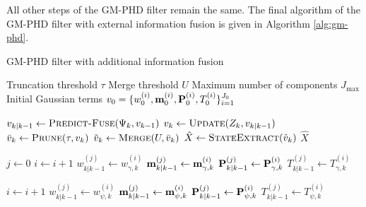 All other steps of the GM-PHD filter remain the same. The final algorithm of the GM-PHD filter with external information fusion is given in Algorithm \ref{alg:gm-phd}.

\begin{algorithm}
\caption{GM-PHD filter with additional information fusion}\label{alg:gm-phd}
\begin{algorithmic}[1]
    \Require Truncation threshold $\tau$
    \Require Merge threshold $U$
    \Require Maximum number of components $J_\mathrm{max}$
    \Require Initial Gaussian terms $v_0 = \{ w_{0}^{(i)}, \vecat{m}{0}^{(i)}, \vecat{P}{0}^{(i)}, T_0^{(i)}\}_{i=1}^{J_0}$

    \item[]
    \label{alg:gm-phd:step}
        \State $v_{k|k-1} \gets \Call{Predict-Fuse}{\Psi_k, v_{k-1}}$
        \State $v_{k} \gets \Call{Update}{Z_k, v_{k|k-1}}$ 
        \State $\bar{v}_k \gets \Call{Prune}{\tau, v_{k}}$ 
        \State $\tilde{v}_k \gets \Call{Merge}{U, \bar{v}_k}$ 
        \State $\hat{X} \gets \Call{StateExtract}{\tilde{v}_k}$ 
        \State \Return $\hat{X}$
    \EndProcedure
    
    \item[]
    \label{alg:gm-phd:predict-fuse}
        \State $j \gets 0$
         
            \State $i \gets i + 1$
            \State $w_{k|k-1}^{(j)} \gets w_{\gamma, k}^{(i)}$
            \State $\vecat{m}{k|k-1}^{(j)} \gets \vecat{m}{\gamma, k}^{(i)}$
            \State $\vecat{P}{k|k-1}^{(j)} \gets \vecat{P}{\gamma, k}^{(i)}$
            \State $T_{k|k-1}^{(j)} \gets T_{\gamma, k}^{(i)}$
        \EndFor

         
            \State $i \gets i + 1$
            \State $w_{k|k-1}^{(j)} \gets w_{\psi, k}^{(i)}$
            \State $\vecat{m}{k|k-1}^{(j)} \gets \vecat{m}{\psi, k}^{(i)}$
            \State $\vecat{P}{k|k-1}^{(j)} \gets \vecat{P}{\psi, k}^{(i)}$
            \State $T_{k|k-1}^{(j)} \gets T_{\psi, k}^{(i)}$
        \EndFor


\end{algorithmic}
\end{algorithm}
